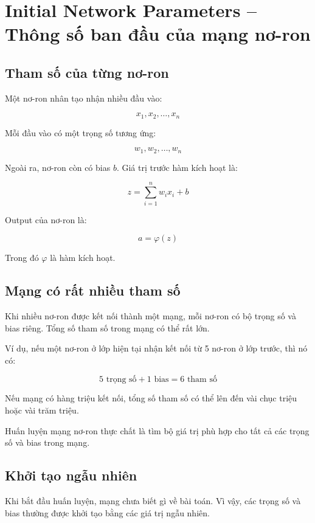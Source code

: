 \section{Initial Network Parameters -- Thông số ban đầu của mạng nơ-ron}

\subsection{Tham số của từng nơ-ron}

Một nơ-ron nhân tạo nhận nhiều đầu vào:

\[
    x_1, x_2, \ldots, x_n
\]

Mỗi đầu vào có một trọng số tương ứng:

\[
    w_1, w_2, \ldots, w_n
\]

Ngoài ra, nơ-ron còn có bias $b$. Giá trị trước hàm kích hoạt là:

\[
    z = \sum_{i=1}^{n} w_i x_i + b
\]

Output của nơ-ron là:

\[
    a = \varphi(z)
\]

Trong đó $\varphi$ là hàm kích hoạt.

\subsection{Mạng có rất nhiều tham số}

Khi nhiều nơ-ron được kết nối thành một mạng, mỗi nơ-ron có bộ trọng số và bias riêng. Tổng số tham số trong mạng có thể rất lớn.

Ví dụ, nếu một nơ-ron ở lớp hiện tại nhận kết nối từ 5 nơ-ron ở lớp trước, thì nó có:

\[
    5 \text{ trọng số} + 1 \text{ bias} = 6 \text{ tham số}
\]

Nếu mạng có hàng triệu kết nối, tổng số tham số có thể lên đến vài chục triệu hoặc vài trăm triệu.

\begin{ghinho}
Huấn luyện mạng nơ-ron thực chất là tìm bộ giá trị phù hợp cho tất cả các trọng số và bias trong mạng.
\end{ghinho}

\subsection{Khởi tạo ngẫu nhiên}

Khi bắt đầu huấn luyện, mạng chưa biết gì về bài toán. Vì vậy, các trọng số và bias thường được khởi tạo bằng các giá trị ngẫu nhiên.

